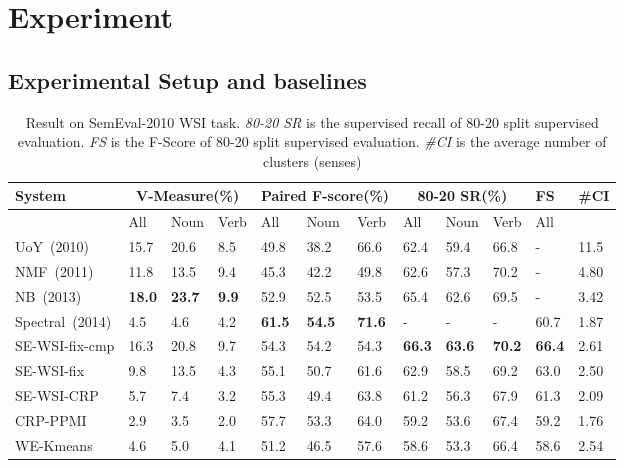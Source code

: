 \documentclass[11pt]{article}
\begin{document}
\section{Experiment}

\subsection{Experimental Setup and baselines}

\begin{table*}
    \centering
    \begin{tabular}{|l|l|l|l|l|l|l|l|l|l|l|l|} 
       \hline
       System     & \multicolumn{3}{c|}{V-Measure(\%)} & \multicolumn{3}{c|}{Paired F-score(\%)} & \multicolumn{3}{c|}{80-20 SR(\%)} & FS &\#CI  \\
       \hline
                  & All  & Noun & Verb & All  & Noun & Verb & All  & Noun & Verb & All & \\
       \hline
        UoY~(2010) & 15.7 & 20.6 & 8.5  & 49.8 & 38.2 & 66.6 & 62.4 & 59.4 & 66.8 & -    & 11.5 \\
NMF~(2011) & 11.8 & 13.5 & 9.4  & 45.3 & 42.2 & 49.8 & 62.6 & 57.3 & 70.2 & -    & 4.80  \\
         NB~(2013) & \textbf{18.0} & \textbf{23.7} & \textbf{9.9}  & 52.9 & 52.5 & 53.5 & 65.4 & 62.6 & 69.5 & -    & 3.42  \\
   Spectral~(2014) & 4.5  & 4.6  & 4.2  & \textbf{61.5} & \textbf{54.5} & \textbf{71.6} & -    & -    & -    & 60.7 & 1.87  \\
       \hline
   SE-WSI-fix-cmp  & 16.3  & 20.8 & 9.7  & 54.3 & 54.2 & 54.3 & \textbf{66.3} & \textbf{63.6} & \textbf{70.2}  & \textbf{66.4} & 2.61  \\
    SE-WSI-fix    & 9.8  & 13.5 & 4.3  & 55.1 & 50.7 & 61.6 & 62.9 & 58.5 & 69.2  & 63.0 & 2.50  \\
    SE-WSI-CRP    & 5.7  & 7.4  & 3.2  & 55.3 & 49.4 & 63.8 & 61.2 & 56.3 & 67.9  & 61.3 & 2.09  \\
       CRP-PPMI   & 2.9  & 3.5  & 2.0  & 57.7 & 53.3 & 64.0 & 59.2 & 53.6 & 67.4  & 59.2 & 1.76  \\
       WE-Kmeans  & 4.6  & 5.0  & 4.1  & 51.2 & 46.5 & 57.6 & 58.6 & 53.3 & 66.4  & 58.6 & 2.54  \\
       \hline
    \end{tabular}
    \caption{{Result on SemEval-2010 WSI task. \emph{80-20 SR} is the supervised recall of 80-20 split supervised evaluation. \emph{FS} is the F-Score of 80-20 split supervised evaluation. \emph{\#CI} is the average number of clusters (senses) }}
    \label{tab:semeval_2010}
\end{table*}
\end{document}

